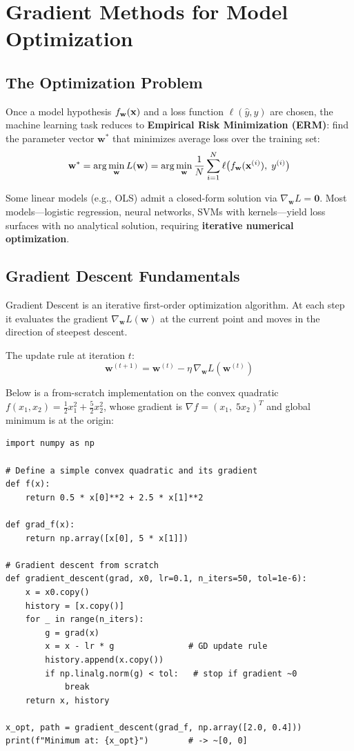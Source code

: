 \chapter*{Gradient Methods for Model Optimization}

\section*{The Optimization Problem}

Once a model hypothesis $f_{\mathbf{w}}(\mathbf{x})$ and a loss function $\ell(\hat{y}, y)$ are chosen, the machine learning task reduces to \textbf{Empirical Risk Minimization (ERM)}: find the parameter vector $\mathbf{w}^*$ that minimizes average loss over the training set:
$$\mathbf{w}^* = \arg\min_{\mathbf{w}} L(\mathbf{w}) = \arg\min_{\mathbf{w}} \frac{1}{N} \sum_{i=1}^N \ell\bigl(f_{\mathbf{w}}(\mathbf{x}^{(i)}),\; y^{(i)}\bigr)$$

Some linear models (e.g., OLS) admit a closed-form solution via $\nabla_{\mathbf{w}} L = \mathbf{0}$. Most models---logistic regression, neural networks, SVMs with kernels---yield loss surfaces with no analytical solution, requiring \textbf{iterative numerical optimization}.

\section*{Gradient Descent Fundamentals}

\begin{definition}
Gradient Descent is an iterative first-order optimization algorithm. At each step it evaluates the gradient $\nabla_{\mathbf{w}} L(\mathbf{w})$ at the current point and moves in the direction of steepest descent.
\end{definition}

The update rule at iteration $t$:
$$\mathbf{w}^{(t+1)} = \mathbf{w}^{(t)} - \eta \,\nabla_{\mathbf{w}} L(\mathbf{w}^{(t)})$$

Below is a from-scratch implementation on the convex quadratic $f(x_1,x_2)=\tfrac{1}{2}x_1^2 + \tfrac{5}{2}x_2^2$, whose gradient is $\nabla f = (x_1,\; 5x_2)^T$ and global minimum is at the origin:

\begin{lstlisting}[style=pythonstyle]
import numpy as np

# Define a simple convex quadratic and its gradient
def f(x):
    return 0.5 * x[0]**2 + 2.5 * x[1]**2

def grad_f(x):
    return np.array([x[0], 5 * x[1]])

# Gradient descent from scratch
def gradient_descent(grad, x0, lr=0.1, n_iters=50, tol=1e-6):
    x = x0.copy()
    history = [x.copy()]
    for _ in range(n_iters):
        g = grad(x)
        x = x - lr * g               # GD update rule
        history.append(x.copy())
        if np.linalg.norm(g) < tol:   # stop if gradient ~0
            break
    return x, history

x_opt, path = gradient_descent(grad_f, np.array([2.0, 0.4]))
print(f"Minimum at: {x_opt}")        # -> ~[0, 0]
\end{lstlisting}

